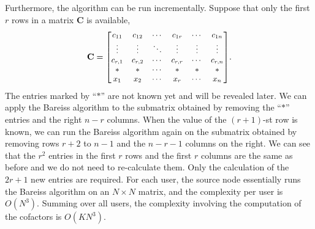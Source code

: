 \documentclass[letterpaper,conference,10pt]{IEEEtran}
\begin{document}

Furthermore, the algorithm can be run incrementally. Suppose that only the first $r$ rows in a matrix $\mathbf{C}$ is available,
\vspace{-0.05cm}
 \[ {\small \mathbf{C} =
\begin{bmatrix}
 c_{11} & c_{12} & \cdots & c_{1r} & \cdots & c_{1n}\\
\vdots & \vdots & \ddots & \vdots & \vdots &\vdots \\
c_{r,1} & c_{r,2} & \cdots & c_{r,r} & \cdots & c_{r,n}\\
* & * & \cdots & * &* &*\\
x_1 & x_2 & \cdots & x_r & \cdots & x_{n}
\end{bmatrix}}.
\]
The entries marked by ``$*$'' are not known yet and will be revealed later. We can apply the Bareiss algorithm to the submatrix obtained by removing the ``$*$'' entries and the right $n-r$ columns. When the value of the $(r+1)$-st row is known, we can run the Bareiss algorithm again on the submatrix obtained by removing rows $r+2$ to $n-1$ and the $n-r-1$ columns on the right. We can see that the $r^2$ entries in the first $r$ rows and the first $r$ columns are the same as before and we do not need to re-calculate them. Only the calculation of the $2r+1$ new entries are required. For each user, the source node essentially runs the Bareiss algorithm on an $N\times N$ matrix, and the complexity per user is $O(N^3)$. Summing over all users, the complexity involving the computation of the cofactors is $O(K N^3)$.
\end{document}

